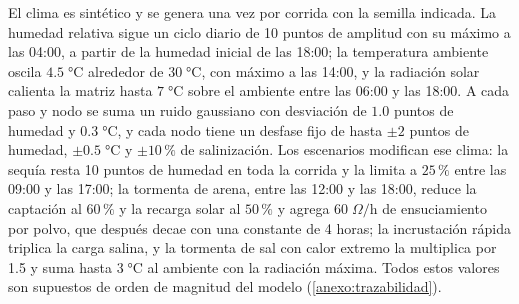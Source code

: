 El clima es sint\'etico y se genera una vez por corrida con la semilla indicada. La humedad relativa sigue un ciclo diario de 10 puntos de amplitud con su m\'aximo a las 04:00, a partir de la humedad inicial de las 18:00; la temperatura ambiente oscila $4.5\;\si{\celsius}$ alrededor de $30\;\si{\celsius}$, con m\'aximo a las 14:00, y la radiaci\'on solar calienta la matriz hasta $7\;\si{\celsius}$ sobre el ambiente entre las 06:00 y las 18:00. A cada paso y nodo se suma un ruido gaussiano con desviaci\'on de $1.0$ puntos de humedad y $0.3\;\si{\celsius}$, y cada nodo tiene un desfase fijo de hasta $\pm 2$ puntos de humedad, $\pm 0.5\;\si{\celsius}$ y $\pm 10\,\%$ de salinizaci\'on. Los escenarios modifican ese clima: la sequ\'ia resta 10 puntos de humedad en toda la corrida y la limita a $25\,\%$ entre las 09:00 y las 17:00; la tormenta de arena, entre las 12:00 y las 18:00, reduce la captaci\'on al $60\,\%$ y la recarga solar al $50\,\%$ y agrega $60\;\Omega\text{/h}$ de ensuciamiento por polvo, que despu\'es decae con una constante de 4 horas; la incrustaci\'on r\'apida triplica la carga salina, y la tormenta de sal con calor extremo la multiplica por 1.5 y suma hasta $3\;\si{\celsius}$ al ambiente con la radiaci\'on m\'axima. Todos estos valores son supuestos de orden de magnitud del modelo (\cref{anexo:trazabilidad}).

